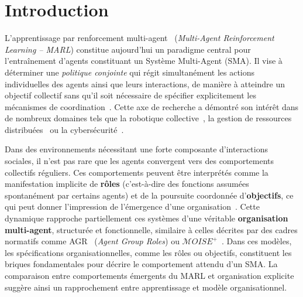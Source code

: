 \documentclass[francais,ROIA,Unicode,manuscript]{cedram}
\title
[MOISE+MARL]
{MOISE+MARL : un cadre organisationnel pour l’explicabilité et le contrôle en apprentissage par renforcement multi-agent \textsuperscript{(1)}}
\author{\firstname{Julien} \lastname{Soulé}}
\author{\firstname{Michel} \lastname{Occello}}
\author{\firstname{Jean-Paul} \lastname{Jamont}}
\author{\firstname{Louis-Marie} \lastname{Traonouez}}
\author{\firstname{Paul} \lastname{Théron}}
\begin{document}
\maketitle


\section{Introduction}

\noindent
L'apprentissage par renforcement multi-agent~\cite{maisonhaute2024} (\textit{Multi-Agent Reinforcement Learning -- MARL}) constitue aujourd'hui un paradigme central pour l'entraînement d'agents constituant un Système Multi-Agent (SMA). Il vise à déterminer une \emph{politique conjointe} qui régit simultanément les actions individuelles des agents ainsi que leurs interactions, de manière à atteindre un objectif collectif sans qu'il soit nécessaire de spécifier explicitement les mécanismes de coordination~\cite{Albrecht2024book}.
%
Cette axe de recherche a démontré son intérêt dans de nombreux domaines tels que la robotique collective~\cite{Wang2025}, la gestion de ressources distribuées~\cite{Chahoud2025} ou la cybersécurité~\cite{Hammar2023}.

\noindent
Dans des environnements nécessitant une forte composante d'interactions sociales, il n’est pas rare que les agents convergent vers des comportements collectifs réguliers. Ces comportements peuvent être interprétés comme la manifestation implicite de \textbf{rôles} (c’est-à-dire des fonctions assumées spontanément par certains agents) et de la poursuite coordonnée d’\textbf{objectifs}, ce qui peut donner l’impression de l’émergence d’une organisation~\cite{Foerster2016}.
%
Cette dynamique rapproche partiellement ces systèmes d’une véritable \textbf{organisation multi-agent}, structurée et fonctionnelle, similaire à celles décrites par des cadres normatifs comme AGR~\cite{ferber2003} (\textit{Agent Group Roles}) ou $\mathcal{M}OISE^+$~\cite{Hubner2007}. Dans ces modèles, les spécifications organisationnelles, comme les rôles ou objectifs, constituent les briques fondamentales pour décrire le comportement attendu d’un SMA. La comparaison entre comportements émergents du MARL et organisation explicite suggère ainsi un rapprochement entre apprentissage et modèle organisationnel.
\end{document}
